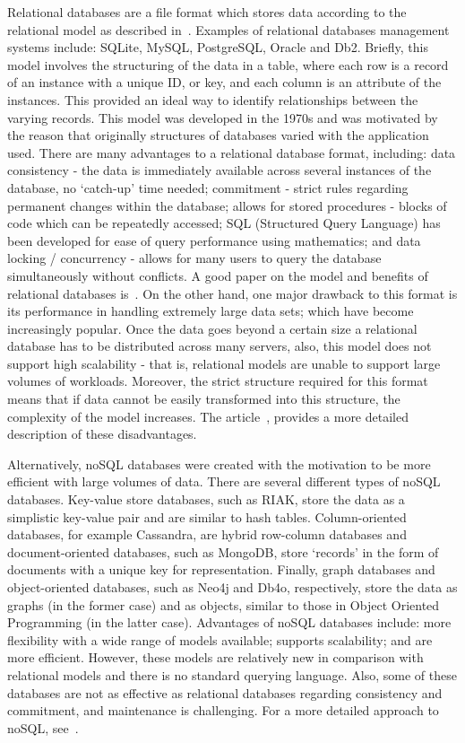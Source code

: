 Relational databases are a file format which stores data according to the
relational model as described in~\cite{Codd2002}. Examples of relational
databases management systems include: SQLite, MySQL, PostgreSQL, Oracle and Db2.
Briefly, this model involves the structuring of the data in a table, where each
row is a record of an instance with a unique ID, or key, and each column is an
attribute of the instances. This provided an ideal way to identify relationships
between the varying records. This model was developed in the 1970s and was
motivated by the reason that originally structures of databases varied with the
application used. There are many advantages to a relational
database format, including: data consistency - the data is immediately available
across several instances of the database, no `catch-up' time needed; commitment
- strict rules regarding permanent changes within the database; allows for
stored procedures - blocks of code which can be repeatedly accessed; SQL
(Structured Query Language) has been developed for ease of query performance
using mathematics; and data
locking / concurrency - allows for many users to query the database
simultaneously without conflicts. A good paper on the model and benefits of
relational databases is~\cite{Oracle2020}. On the other hand, one major
drawback to this format is its performance in handling extremely large data
sets; which have become increasingly popular. Once the data goes beyond a
certain size a relational database has to be distributed across many servers,
also, this model does not support high scalability - that is, relational models
are unable to support large volumes of workloads. Moreover, the strict structure
required for this format means that if data cannot be easily transformed
into this structure, the complexity of the model increases. The
article~\cite{Jatana2012}, provides a more detailed description of these disadvantages. 

Alternatively, noSQL databases were created with the motivation to be more
efficient with large volumes of data. There are several different types of noSQL
databases. Key-value store databases, such as RIAK, store the data as a
simplistic key-value pair and are similar to hash tables. Column-oriented
databases, for example Cassandra, are hybrid row-column databases and
document-oriented databases, such as MongoDB, store `records' in the form of
documents with a unique key for representation. Finally, graph databases and
object-oriented databases, such as Neo4j and Db4o, respectively, store the data
as graphs (in the former case) and as objects, similar to those in Object
Oriented Programming (in the latter case). Advantages of noSQL databases
include: more flexibility with a wide range of models available; supports
scalability; and are more efficient. However, these models are relatively new in
comparison with relational models and there is no standard querying language.
Also, some of these databases are not as effective as relational databases
regarding consistency and commitment, and maintenance is challenging. For a more
detailed approach to noSQL, see~\cite{Nayak2013}.    

